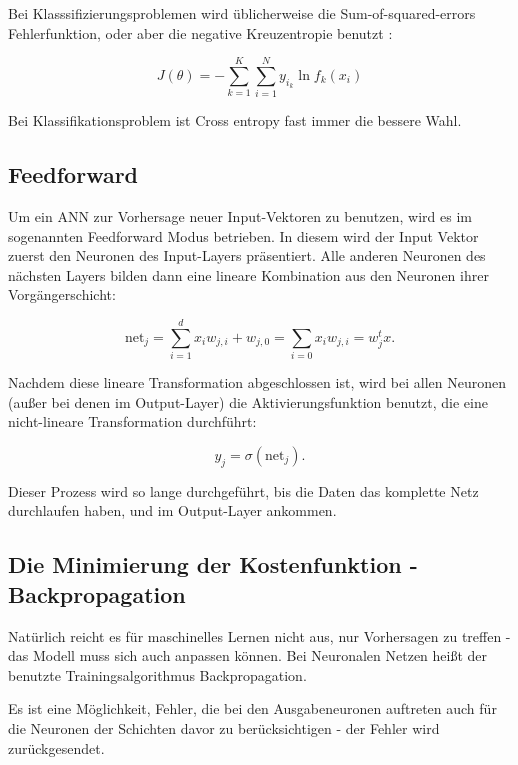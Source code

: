 Bei Klasssifizierungsproblemen wird üblicherweise die Sum-of-squared-errors Fehlerfunktion, oder aber die negative Kreuzentropie benutzt \cite{Hastie2009}:

\begin{equation}
    J(\theta) = -\sum_{k=1}^K \sum_{i=1}^N y_{i_k} \ln f_k(x_i)
\end{equation}

Bei Klassifikationsproblem ist Cross entropy fast immer die bessere Wahl. 


\subsection{Feedforward}
Um ein ANN zur Vorhersage neuer Input-Vektoren zu benutzen, wird es im sogenannten Feedforward Modus betrieben. In diesem wird der Input Vektor zuerst den Neuronen des Input-Layers präsentiert. Alle anderen Neuronen des nächsten Layers bilden dann eine lineare Kombination aus den Neuronen ihrer Vorgängerschicht: 

\begin{equation}
\text{net}_j = \sum_{i=1}^d x_i w_{j,i} + w_{j,0} = \sum_{i=0} x_i w_{j,i} = 
w_j^t x.
\end{equation}

Nachdem diese lineare Transformation abgeschlossen ist, wird bei allen Neuronen (außer bei denen im Output-Layer) die Aktivierungsfunktion benutzt, die eine nicht-lineare Transformation durchführt: 

\begin{equation}
y_j = \sigma (\text{net}_j).
\end{equation}

Dieser Prozess wird so lange durchgeführt, bis die Daten das komplette Netz durchlaufen haben, und im Output-Layer ankommen.

\cite{duda2012pattern}

\subsection{Die Minimierung der Kostenfunktion - Backpropagation}

Natürlich reicht es für maschinelles Lernen nicht aus, nur Vorhersagen zu treffen - das Modell muss sich auch anpassen können. Bei Neuronalen Netzen heißt der benutzte Trainingsalgorithmus Backpropagation.

Es ist eine Möglichkeit, Fehler, die bei den Ausgabeneuronen auftreten auch für die Neuronen der Schichten davor zu berücksichtigen - der Fehler wird zurückgesendet.

